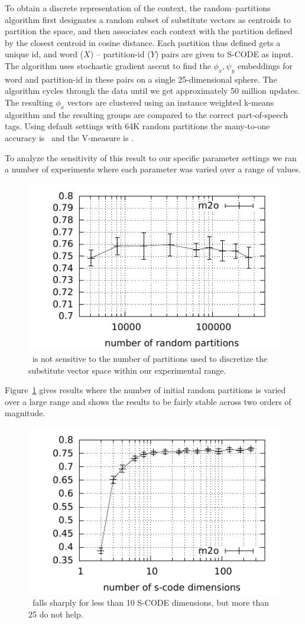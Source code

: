 To obtain a discrete representation of the context, the
random--partitions algorithm first designates a random subset of
substitute vectors as centroids to partition the space, and then
associates each context with the partition defined by the closest
centroid in cosine distance.  Each partition thus defined gets a
unique id, and word ($X$) -- partition-id ($Y$) pairs are given to
S-CODE as input.  The algorithm uses stochastic gradient ascent to
find the $\phi_x, \psi_y$ embeddings for word and partition-id in
these pairs on a single 25-dimensional sphere.  The algorithm cycles
through the data until we get approximately 50 million updates.  The
resulting $\phi_x$ vectors are clustered using an instance weighted
k-means algorithm and the resulting groups are compared to the correct
part-of-speech tags.  Using default settings with 64K random
partitions the many-to-one accuracy is \rpmto\ and the V-measure is
\rpvm.

To analyze the sensitivity of this result to our specific parameter
settings we ran a number of experiments where each parameter was
varied over a range of values.

\begin{figure}[ht] \centering
\includegraphics[width=0.5\linewidth]{plot-p.pdf}
\caption{\mto\ is not sensitive to the number of partitions used to
  discretize the substitute vector space within our experimental
  range.}
\label{plot-p}
\end{figure}

Figure~\ref{plot-p} gives results where the number of initial random
partitions is varied over a large range and shows the results to be
fairly stable across two orders of magnitude.

\begin{figure}[ht] \centering
\includegraphics[width=0.5\linewidth]{plot-d.pdf}
\caption{\mto\ falls sharply for less than 10 S-CODE dimensions, but
  more than 25 do not help.}
\label{plot-d}
\end{figure}

